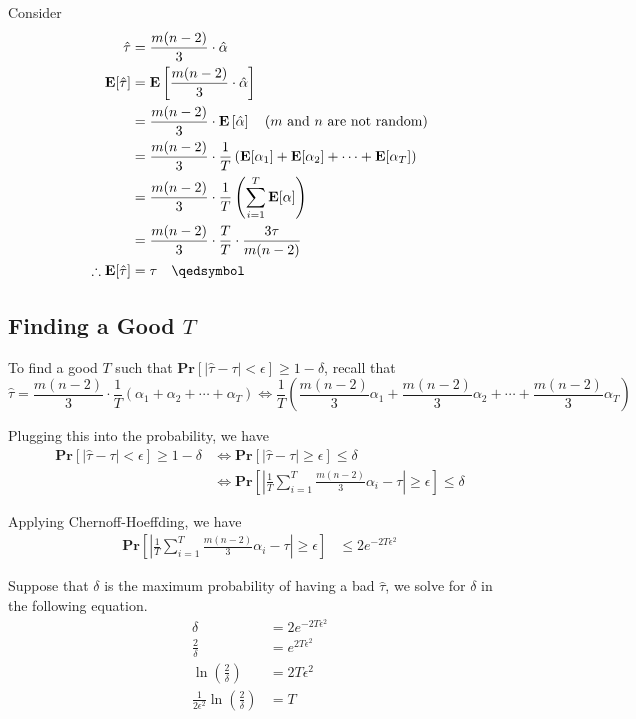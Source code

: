 Consider
\begin{equation*}
\begin{aligned}
  \hat{\tau}
    &= \frac{m(n-2)}{3}\cdot\hat{\alpha} \\
  \mathbf{E}[\hat{\tau}]
    &= \mathbf{E}\left[\frac{m(n-2)}{3}\cdot\hat{\alpha}\right] \\
    &= \frac{m(n-2)}{3}\cdot\mathbf{E}\left[\hat{\alpha}\right] \quad \text{($m$ and $n$ are not random)} \\
    &= \frac{m(n-2)}{3}\cdot\frac{1}{T}\left(\mathbf{E}[\alpha_1] + \mathbf{E}[\alpha_2] + \cdots + \mathbf{E}[\alpha_T]\right) \\
    &= \frac{m(n-2)}{3}\cdot\frac{1}{T}\left(\sum_{i=1}^T \mathbf{E}[\alpha]\right) \\
    &= \frac{m(n-2)}{3}\cdot\frac{T}{T}\cdot \frac{3\tau}{m(n-2)} \\
  \therefore \mathbf{E}[\hat{\tau}]
    &= \tau \quad \qedsymbol
\end{aligned}
\end{equation*}

\subsection{Finding a Good $T$}

To find a good $T$ such that $\mathbf{Pr}[|\hat{\tau} - \tau| < \epsilon] \geq 1 - \delta$, recall that 
\[
  \hat{\tau}
    = \frac{m(n-2)}{3}\cdot\frac{1}{T}(\alpha_1 + \alpha_2 + \cdots + \alpha_T)
    \iff \frac{1}{T}\left(\frac{m(n-2)}{3}\alpha_1 + \frac{m(n-2)}{3}\alpha_2 + \cdots + \frac{m(n-2)}{3}\alpha_T\right)
\]

Plugging this into the probability, we have
\[
\begin{aligned}
  \mathbf{Pr}[|\hat{\tau} - \tau| < \epsilon] \geq 1 - \delta
    &\iff \mathbf{Pr}[|\hat{\tau} - \tau| \geq \epsilon] \leq \delta \\
    &\iff \mathbf{Pr}\left[\left|\frac{1}{T}\sum_{i=1}^T\frac{m(n-2)}{3}\alpha_i - \tau\right| \geq \epsilon\right] \leq \delta
\end{aligned}
\]

Applying Chernoff-Hoeffding, we have
\[
\begin{aligned}
  \mathbf{Pr}\left[\left|\frac{1}{T}\sum_{i=1}^T\frac{m(n-2)}{3}\alpha_i - \tau\right| \geq \epsilon\right] &\leq  2e^{-2T\epsilon^2}
\end{aligned}  
\]

Suppose that $\delta$ is the maximum probability of having a bad $\hat{\tau}$, we solve for $\delta$ in the following equation.
\[
\begin{aligned}
	\delta &= 2e^{-2T\epsilon^2} \\
	\frac{2}{\delta} &= e^{2T\epsilon^2} \\
	\ln\left(\frac{2}{\delta}\right) &= 2T\epsilon^2 \\
	\frac{1}{2\epsilon^2}\ln\left(\frac{2}{\delta}\right) &= T
\end{aligned}  
\]

